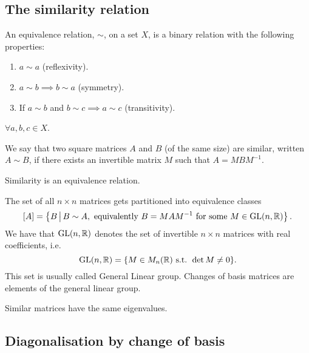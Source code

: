 \documentclass[10pt, a4paper]{article}
\begin{document}
\subsection{The similarity relation}
\begin{definition}
    An equivalence relation,
    $\sim$,
    on a set $X$,
    is a binary relation with the following properties:
    \begin{enumerate}[label = (\roman*)]
        \item $a \sim a$
        (reflexivity).
        
        \item $a \sim b \implies b \sim a$
        (symmetry).

        \item If $a \sim b$ and $b \sim c \implies a \sim c$
        (transitivity).
    \end{enumerate}
    $\forall a, b, c \in X$.
\end{definition}

\begin{definition}
    We say that two square matrices $A$ and $B$
    (of the same size)
    are similar,
    written $A \sim B$,
    if there exists an invertible matrix $M$ such that $A = MBM ^ {-1}$.
\end{definition}

\begin{proposition}
    Similarity is an equivalence relation.
\end{proposition}

The set of all $n \times n$ matrices gets partitioned into equivalence classes
\[
\left[A\right] = \left\{B \,\middle|\, B \sim A, \text{ equivalently } B = MAM ^ {-1}\text{ for some } M \in \mathrm{GL}(n, \mathbb{R})\right\}.
\]
We have that $\mathrm{GL}(n, \mathbb{R})$ denotes the set of invertible $n \times n$ matrices with real coefficients,
i.e.
\[
\mathrm{GL}(n, \mathbb{R}) = \{M \in M_n(\mathbb{R})\text{ s.t. } \det{M} \neq 0\}.
\]
This set is usually called General Linear group.
Changes of basis matrices are elements of the general linear group.

\begin{proposition}
    Similar matrices have the same eigenvalues.
\end{proposition}

\subsection{Diagonalisation by change of basis}
\end{document}
